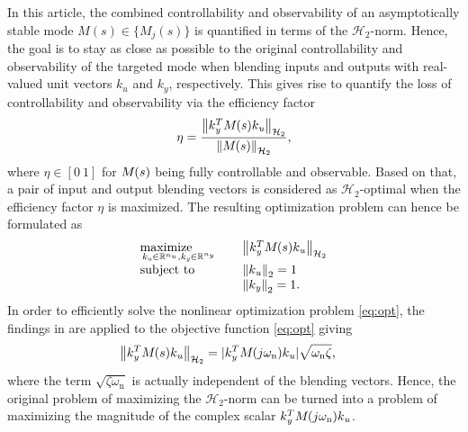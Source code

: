 \documentclass[aerospace,article,submit,moreauthors,pdftex,10pt,a4paper]{Definitions/mdpi}
\begin{document}
In this article, the combined controllability and observability of an asymptotically stable mode $M(s) \in \{ M_j (s) \}$ is quantified in terms of the $\mathcal{H}_2$-norm. 
Hence, the goal is to stay as close as possible to the original controllability and observability of the targeted mode when blending inputs and outputs with real-valued unit vectors $k_u$ and $k_y$, respectively.
This gives rise to quantify the loss of controllability and observability via the efficiency factor
%
\begin{align}
\label{eq:eta}
\eta=\frac{\Hnorm{ \aevec{k}{y}^T \aemat{M}{}(s) \aevec{k}{u} }{2}}
{\Hnorm{ \aemat{M}{}(s)}{2}},
\end{align}
%
where $\eta \in [0 ~ 1]$ for $\aemat{M}{}(s)$ being fully controllable and observable. Based on that, a pair of input and output blending vectors is considered as $\mathcal{H}_2$-optimal when the efficiency factor $\eta$ is maximized. The resulting optimization problem can hence be formulated as
%
\begin{align}
\label{eq:opt}
\begin{array}{lll}
\underset{\aevec{k}{u} \in \mathbb{R}^{n_u},\aevec{k}{y} \in \mathbb{R}^{n_y}}{\mathrm{maximize \quad \quad}}
& &
\Hnorm{ \aevec{k}{y}^T \aemat{M}{}(s) \aevec{k}{u} }{2}
\\
\text{subject to}
& &
\norm{ \aevec{k}{u} }{2} = 1
\\
& &
\norm{ \aevec{k}{y} }{2} = 1.
\end{array}
\end{align}
%
In order to efficiently solve the nonlinear optimization problem \eqref{eq:opt}, the findings in \cite{Pusch18a} are applied to the objective function \eqref{eq:opt} giving
%
\begin{align}
\label{eq:applyH2norm}
\Hnorm{ \aevec{k}{y}^T \aemat{M}{}(s) \aevec{k}{u}  }{2}
&=
|\aevec{k}{y}^T \aemat{M}{}(j\omega_{\text{n}}) \aevec{k}{u}|
\sqrt{\omega_{\textup{n}} \zeta},
\end{align}
%
where the term $\sqrt{ \zeta \omega_{\text{n}}}$ is actually independent of the blending vectors. Hence, the original problem of maximizing the $\mathcal{H}_2$-norm can be turned into a problem of maximizing the magnitude of the complex scalar $\aevec{k}{y}^T \aemat{M}{}(j\omega_{\text{n}}) \aevec{k}{u}$. 
\end{document}
